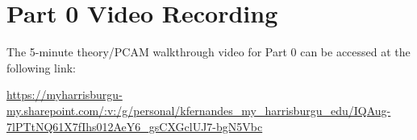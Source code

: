 \documentclass[11pt]{article}
\begin{document}
\section{Part 0 Video Recording}

The 5-minute theory/PCAM walkthrough video for Part 0 can be accessed at the following link:

\url{https://myharrisburgu-my.sharepoint.com/:v:/g/personal/kfernandes_my_harrisburgu_edu/IQAug-7lPTtNQ61X7fIhs012AeY6_gsCXGclUJ7-bgN5Vbc}
\end{document}

